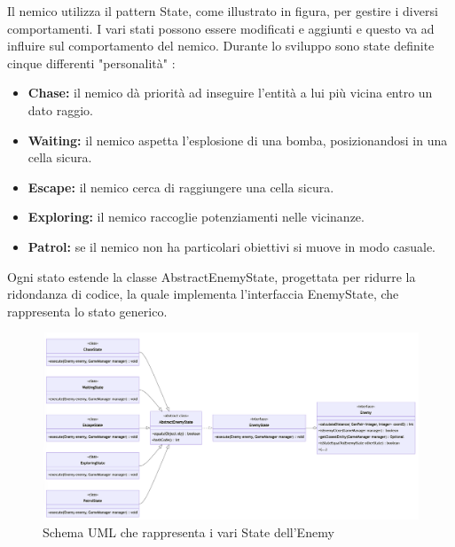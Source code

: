 \documentclass[a4paper,12pt]{report}
\begin{document}
\par
Il nemico utilizza il pattern State, come illustrato in figura, per gestire i diversi comportamenti. I vari stati possono essere modificati e aggiunti e questo va ad influire sul comportamento del nemico. Durante lo sviluppo sono state definite cinque differenti "personalità" :
\begin{itemize}
 \item \textbf{Chase:} il nemico dà priorità ad inseguire l’entità a lui più vicina entro un dato raggio.
 \item \textbf{Waiting:} il nemico aspetta l’esplosione di una bomba, posizionandosi in una cella sicura.
 \item \textbf{Escape:}  il nemico cerca di raggiungere una cella sicura.
 \item \textbf{Exploring:}  il nemico raccoglie potenziamenti nelle vicinanze.
 \item \textbf{Patrol:} se il nemico non ha particolari obiettivi si muove in modo casuale.
\end{itemize}

\par
Ogni stato estende la classe AbstractEnemyState, progettata per ridurre la ridondanza di codice, la quale implementa l’interfaccia EnemyState, che rappresenta lo stato generico.

\begin{figure}[h]
\centering{}
\includegraphics[width=\textwidth]{img/enemyState.png}
\caption{Schema UML che rappresenta i vari State dell'Enemy}
\end{figure}
\end{document}

